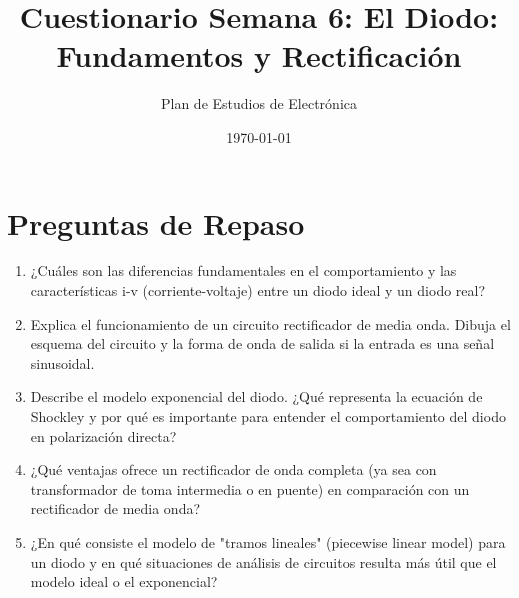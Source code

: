 \documentclass{article}
\title{Cuestionario Semana 6: El Diodo: Fundamentos y Rectificación}
\author{Plan de Estudios de Electrónica}
\date{\today}
\begin{document}
\maketitle

\section*{Preguntas de Repaso}

\begin{enumerate}
    \item ¿Cuáles son las diferencias fundamentales en el comportamiento y las características i-v (corriente-voltaje) entre un diodo ideal y un diodo real?
    
    \item Explica el funcionamiento de un circuito rectificador de media onda. Dibuja el esquema del circuito y la forma de onda de salida si la entrada es una señal sinusoidal.
    
    \item Describe el modelo exponencial del diodo. ¿Qué representa la ecuación de Shockley y por qué es importante para entender el comportamiento del diodo en polarización directa?
    
    \item ¿Qué ventajas ofrece un rectificador de onda completa (ya sea con transformador de toma intermedia o en puente) en comparación con un rectificador de media onda?
    
    \item ¿En qué consiste el modelo de "tramos lineales" (piecewise linear model) para un diodo y en qué situaciones de análisis de circuitos resulta más útil que el modelo ideal o el exponencial?
\end{enumerate}
\end{document}
